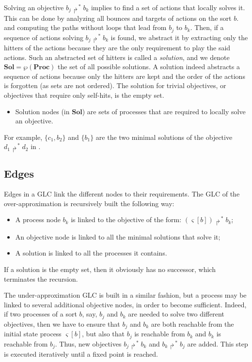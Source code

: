 \documentclass{movep}
\def\pref{\prettyref}
\newcommand{\Proc}{\mathbf{Proc}}
\newcommand{\powerset}{\wp}
\newcommand{\PHfrappeB}{\Rsh}
\newcommand{\PHobjectif}[2]{\mbox{$#1\PHfrappeB^*\!#2$}}
\newcommand{\PHobj}{\PHobjectif}
\def\ctx{\varsigma}
\newcommand{\Sol}{\mathbf{Sol}}
\def\PHget#1#2{{#1[#2]}}
\def\ctx{\varsigma}
\newcounter{la}
\newcommand{\ie}{i.e.\ }
\begin{document}
Solving an objective $\PHobj{b_j}{b_k}$
implies to find a set of actions that locally solves it.
This can be done by analyzing all bounces and targets of actions on the sort $b$.
and computing the paths without loops that lead from $b_j$ to $b_k$.
Then, if a sequence of actions solving $\PHobj{b_j}{b_k}$ is found,
we abstract it by extracting only the hitters of the actions
because they are the only requirement to play the said actions.
Such an abstracted set of hitters is called a \emph{solution},
and we denote $\Sol = \powerset(\Proc)$ the set of all possible solutions.
A solution indeed abstracts a sequence of actions because only the hitters are kept
and the order of the actions is forgotten (as sets are not ordered).
The solution for trivial objectives,
or objectives that require only self-hits, is the empty set.

\begin{itemize}
  \item 
Solution nodes (in $\Sol$) are sets of processes that are required to locally solve an objective.
\end{itemize}
For example, $\{ c_1, b_2 \}$ and $\{ b_1 \}$ are the two minimal solutions of
the objective $\PHobj{d_1}{d_2}$ in \pref{fig:ph}.

\subsection{Edges}

Edges in a GLC link the different nodes to their requirements.
The GLC of the over-approximation is recursively built the following way:
\begin{itemize}
  \item A process node $b_k$ is linked to the objective of the form: $\PHobj{(\PHget{\ctx}{b})}{b_k}$;
  \item An objective node is linked to all the minimal solutions that solve it;
  \item A solution is linked to all the processes it contains.
\end{itemize}
If a solution is the empty set, then it obviously has no successor, which terminates the recursion.

The under-approximation GLC is built in a similar fashion,
but a process may be linked to several additional objective nodes, in order to become sufficient.
Indeed, if two processes of a sort $b$, say, $b_j$ and $b_k$ are needed to solve
two different objectives, %
then we have to ensure that
$b_j$ and $b_k$ are both reachable from the initial state process $\PHget{\ctx}{b}$,
but also that $b_j$ is reachable from $b_k$ and $b_k$ is reachable from $b_j$.
Thus, new objectives $\PHobj{b_j}{b_k}$ and $\PHobj{b_k}{b_j}$ are added.
This step is executed iteratively until a fixed point is reached.
\end{document}

